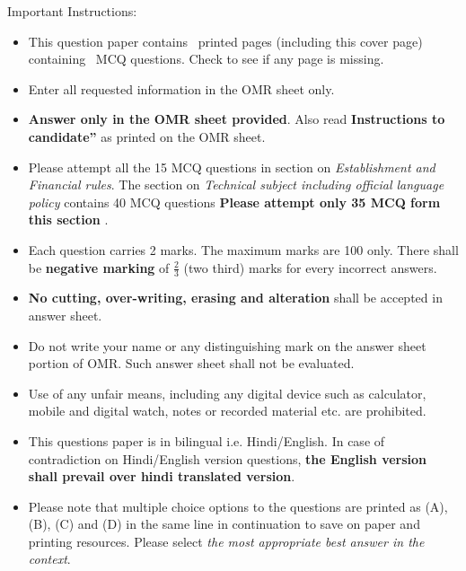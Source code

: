 \documentclass[12pt,addpoints]{exam} %
\begin{document}
Important Instructions:
\begin{itemize}
\item This question paper contains \numpages\ printed pages (including this cover page) containing \numquestions\ MCQ questions.  Check to see if any page is  missing. 
\item Enter all requested information in the OMR sheet only.
\item \textbf{Answer only in the OMR sheet provided}. Also read \textbf{Instructions to  candidate”} as printed on the OMR sheet.
\item Please attempt all the 15 MCQ questions in section on \emph{Establishment and Financial rules}. The section on \emph{Technical subject including official language policy} contains 40 MCQ  questions \textbf{Please attempt only 35 MCQ form this section} .   
\item Each question carries 2 marks. The maximum marks are 100 only. There shall be \textbf{negative marking} 
of \( \frac{2}{3} \)  (two third) marks for every incorrect answers. 
\item \textbf{No cutting, over-writing, erasing and alteration} shall be accepted in answer sheet.
\item 	Do not write your name or any distinguishing mark on the answer sheet portion of OMR.  Such answer sheet shall not be evaluated.
\item 	Use of any unfair means, including any digital device such as calculator, mobile and digital watch, notes or recorded material  etc. are prohibited. 
\item This questions paper is in bilingual i.e. Hindi/English.  In case of contradiction on Hindi/English version questions, \textbf{ the English version shall prevail over hindi translated version}.
\item Please note that multiple choice options to the questions are printed as (A), (B), (C) and (D) in the same line in continuation to save on paper and printing resources. Please select \emph{the most appropriate best answer in the context}.
\end{itemize}


\addpoints                %
\end{document}
